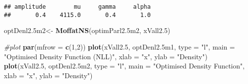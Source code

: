 \documentclass[
]{article}
\newenvironment{Shaded}{\begin{snugshade}}{\end{snugshade}}
\newcommand{\AttributeTok}[1]{\textcolor[rgb]{0.13,0.29,0.53}{#1}}
\newcommand{\CommentTok}[1]{\textcolor[rgb]{0.56,0.35,0.01}{\textit{#1}}}
\newcommand{\DecValTok}[1]{\textcolor[rgb]{0.00,0.00,0.81}{#1}}
\newcommand{\FloatTok}[1]{\textcolor[rgb]{0.00,0.00,0.81}{#1}}
\newcommand{\FunctionTok}[1]{\textcolor[rgb]{0.13,0.29,0.53}{\textbf{#1}}}
\newcommand{\NormalTok}[1]{#1}
\newcommand{\OtherTok}[1]{\textcolor[rgb]{0.56,0.35,0.01}{#1}}
\newcommand{\SpecialCharTok}[1]{\textcolor[rgb]{0.81,0.36,0.00}{\textbf{#1}}}
\newcommand{\StringTok}[1]{\textcolor[rgb]{0.31,0.60,0.02}{#1}}
\begin{document}
\begin{Shaded}
\end{Shaded}

\begin{verbatim}
## amplitude        mu     gamma     alpha 
##       0.4    4115.0       0.4       1.0
\end{verbatim}

\begin{Shaded}
\begin{Highlighting}[]
\NormalTok{optDenl2}\FloatTok{.5}\NormalTok{m2}\OtherTok{\textless{}{-}} \FunctionTok{MoffatNS}\NormalTok{(optimParl2}\FloatTok{.5}\NormalTok{m2, xVall2}\FloatTok{.5}\NormalTok{)}

\CommentTok{\#plot}
\FunctionTok{par}\NormalTok{(}\AttributeTok{mfrow =} \FunctionTok{c}\NormalTok{(}\DecValTok{1}\NormalTok{,}\DecValTok{2}\NormalTok{))}
\FunctionTok{plot}\NormalTok{(xVall2}\FloatTok{.5}\NormalTok{, optDenl2}\FloatTok{.5}\NormalTok{m1, }\AttributeTok{type =} \StringTok{"l"}\NormalTok{, }\AttributeTok{main =} \StringTok{"Optimised Density Function (NLL)"}\NormalTok{, }\AttributeTok{xlab =} \StringTok{"x"}\NormalTok{, }\AttributeTok{ylab =} \StringTok{"Density"}\NormalTok{)}
\FunctionTok{plot}\NormalTok{(xVall2}\FloatTok{.5}\NormalTok{, optDenl2}\FloatTok{.5}\NormalTok{m2, }\AttributeTok{type =} \StringTok{"l"}\NormalTok{, }\AttributeTok{main =} \StringTok{"Optimised Density Function"}\NormalTok{, }\AttributeTok{xlab =} \StringTok{"x"}\NormalTok{, }\AttributeTok{ylab =} \StringTok{"Density"}\NormalTok{)}
\end{Highlighting}
\end{Shaded}
\end{document}
